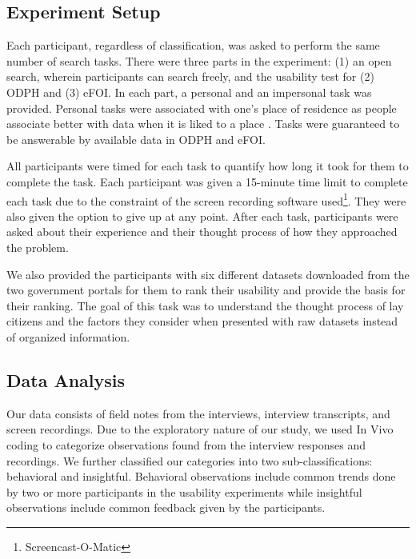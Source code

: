 \documentclass{sigchi}
\begin{document}


\subsection{Experiment Setup}
Each participant, regardless of classification, was asked to perform the same number of search tasks. There were three parts in the experiment: (1) an open search, wherein participants can search freely, and the usability test for (2) ODPH and (3) eFOI. In each part, a personal and an impersonal task was provided. Personal tasks were associated with one's place of residence as people associate better with data when it is liked to a place \cite{Puussaar2018}. Tasks were guaranteed to be answerable by available data in ODPH and eFOI. 

All participants were timed for each task to quantify how long it took for them to complete the task. Each participant was given a 15-minute time limit to complete each task due to the constraint of the screen recording software used\footnote{Screencast-O-Matic}. They were also given the option to give up at any point. After each task, participants were asked about their experience and their thought process of how they approached the problem.

We also provided the participants with six different datasets downloaded from the two government portals for them to rank their usability and provide the basis for their ranking. The goal of this task was to understand the thought process of lay citizens and the factors they consider when presented with raw datasets instead of organized information. 

\subsection{Data Analysis}
Our data consists of field notes from the interviews, interview transcripts, and screen recordings. Due to the exploratory nature of our study, we used In Vivo coding to categorize observations found from the interview responses and recordings. We further classified our categories into two sub-classifications: behavioral and insightful. Behavioral observations include common trends done by two or more participants in the usability experiments while insightful observations include common feedback given by the participants. 
\end{document}
